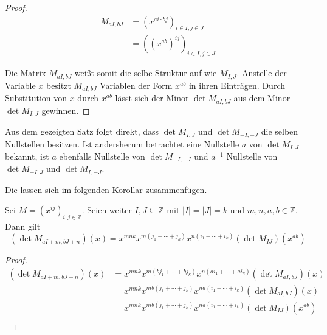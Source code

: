 \begin{proof}    
    \begin{align*}
        M_{aI,bJ}   &= \left(x^{ai\cdot bj}\right)_{i\in I,j\in J} \\
                    &= \left((x^{ab})^{ij}\right)_{i\in I,j\in J}
    \end{align*}

    Die Matrix $M_{aI,bJ}$ weißt somit die selbe Struktur auf wie $M_{I,J}$. Anstelle der Variable $x$ besitzt $M_{aI,bJ}$ Variablen der Form $x^{ab}$ in ihren Einträgen. Durch Substitution von $x$ durch $x^{ab}$ lässt sich der Minor $\det M_{aI,bJ}$ aus dem Minor $\det M_{I,J}$ gewinnen.
\end{proof}

Aus dem gezeigten Satz folgt direkt, dass $\det{} M_{I,J}$ und $\det{} M_{-I,-J}$ die selben Nullstellen besitzen. Ist andersherum betrachtet eine Nullstelle $a$ von $\det M_{I,J}$ bekannt, ist $a$ ebenfalls Nullstelle von $\det M_{-I,-J}$ und $a^{-1}$ Nullstelle von $\det M_{-I,J}$ und $\det M_{I,-J}$.

Die  lassen sich im folgenden Korollar zusammenfügen.

\begin{korollar}
    Sei $M = \left( x^{ij} \right)_{i,j \in \mathbb{Z}}$. Seien weiter $I,J \subseteq \mathbb{Z}$ mit $|I|=|J|=k$ und $m,n,a,b \in \mathbb{Z}$. Dann gilt
    \begin{equation*}
        \left( \det{} M_{aI+m,bJ+n} \right) (x) = x^{mnk} x^{m(j_1 +\cdots + j_k)} x^{n(i_1+\cdots +i_k)} \left( \det{} M_{IJ} \right) (x^{ab})
    \end{equation*}
\end{korollar}

\begin{proof}
    \begin{align*}
        \left( \det{} M_{aI+m,bJ+n} \right) (x)     &= x^{mnk} x^{m(bj_1 +\cdots + bj_k)} x^{n(ai_1+\cdots +ai_k)} \left( \det{} M_{aI,bJ} \right) (x) \\
                                                    &= x^{mnk} x^{mb(j_1 +\cdots + j_k)} x^{na(i_1+\cdots +i_k)} \left( \det{} M_{aI,bJ} \right) (x) \\
                                                    &= x^{mnk} x^{mb(j_1 +\cdots + j_k)} x^{na(i_1+\cdots +i_k)} \left( \det{} M_{IJ} \right) (x^{ab}) \\
    \end{align*}
\end{proof}

